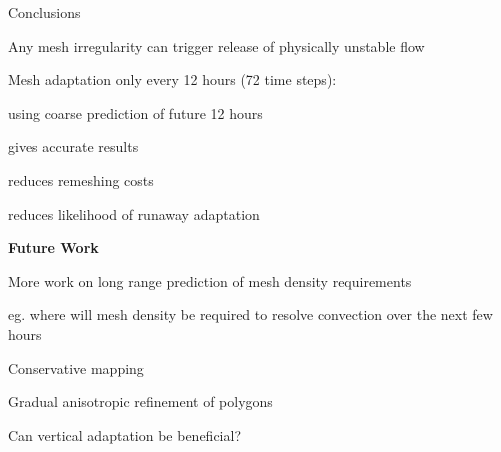 \begin{slide}{Conclusions}

\begin{list0}

\item Any mesh irregularity can trigger release of physically unstable flow

\item Mesh adaptation only every 12 hours (72 time steps):

\begin{list1}
\item using coarse prediction of future 12 hours
\item gives accurate results
\item reduces remeshing costs
\item reduces likelihood of runaway adaptation
\end{list1}
\end{list0}

\begin{center}\Large\bfseries Future Work \end{center}

\begin{list0}

\item More work on long range prediction of mesh density requirements

\begin{list2}
    \item eg. where will mesh density be required to resolve convection over the
    next few hours
\end{list2}

\item Conservative mapping

\item Gradual anisotropic refinement of polygons

\item Can vertical adaptation be beneficial?

\end{list0}

\end{slide}